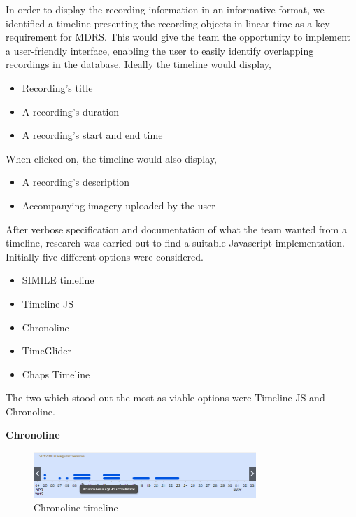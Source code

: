 \documentclass{l3proj}
\begin{document}

In order to display the recording information in an informative format, we identified a timeline presenting the recording objects in linear time as a key requirement for MDRS. This would give the team the opportunity to implement a user-friendly interface, enabling the user to easily identify overlapping recordings in the database. Ideally the timeline would display,

\begin{itemize}
\item{Recording's title}
\item{A recording's duration}
\item{A recording's start and end time}
\end{itemize}

When clicked on, the timeline would also display,
\begin{itemize}
\item{A recording's description}
\item{Accompanying imagery uploaded by the user}
\end{itemize}

After verbose specification and documentation of what the team wanted from a timeline, research was carried out to find a suitable Javascript implementation. Initially five different options were considered.
\begin{itemize}
\item{SIMILE timeline\cite{SIMILE}}
\item{Timeline JS\cite{TimelineJS}}
\item{Chronoline\cite{Chronoline}}
\item{TimeGlider\cite{TimegliderGithub}}
\item{Chaps Timeline\cite{Chaps}}
\end{itemize}
The two which stood out the most as viable options were Timeline JS and Chronoline.

\textbf{Chronoline}
\begin{figure}[ht!]
  \centering
\includegraphics[width=0.75\textwidth]{images/Chronoline.png}
\caption{Chronoline timeline}
\end{figure}
\end{document}
